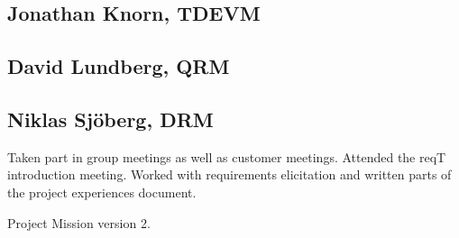 \documentclass[10pt]{article}
\begin{document}
\subsection{Jonathan Knorn, TDEVM}
\subsection{David Lundberg, QRM}
\subsection{Niklas Sjöberg, DRM}
Taken part in group meetings as well as customer meetings. Attended the reqT introduction meeting. Worked with requirements elicitation and written parts of the project experiences document. 

\begin{thebibliography}{1}
 Project Mission version 2. 

\end{thebibliography}
\end{document}
